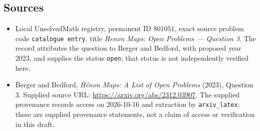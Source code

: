 \documentclass[11pt]{article}
\begin{document}
\subsection{Sources}
\begin{itemize}
\item Local UnsolvedMath registry, permanent ID \(801051\), exact source problem code \texttt{catalogue entry}, title \emph{Henon Maps: Open Problems --- Question 3}. The record attributes the question to Berger and Bedford, with proposed year 2023, and supplies the status \texttt{open}; that status is not independently verified here.
\item Berger and Bedford, \emph{H\'enon Maps: A List of Open Problems} (2023), Question 3. Supplied source URL: \url{https://arxiv.org/abs/2312.03907}. The supplied provenance records access on 2026-10-16 and extraction by \texttt{arxiv\_latex}; these are supplied provenance statements, not a claim of access or verification in this draft.
\end{itemize}
\end{document}
